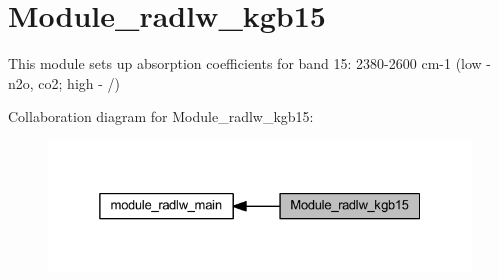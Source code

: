 \hypertarget{group__module__radlw__kgb15}{}\section{Module\+\_\+radlw\+\_\+kgb15}
\label{group__module__radlw__kgb15}


This module sets up absorption coefficients for band 15\+: 2380-\/2600 cm-\/1 (low -\/ n2o, co2; high -\/ /)  


Collaboration diagram for Module\+\_\+radlw\+\_\+kgb15\+:\nopagebreak
\begin{figure}[H]
\begin{center}
\leavevmode
\includegraphics[width=325pt]{group__module__radlw__kgb15}
\end{center}
\end{figure}
